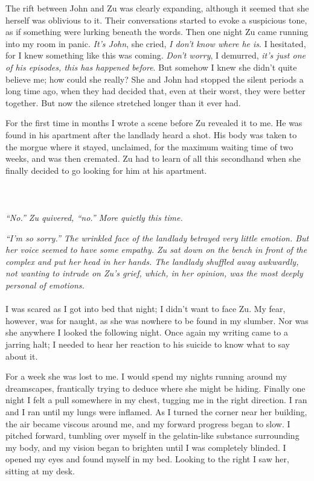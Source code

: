 \documentclass[12pt,oneside,openany]{memoir}
\begin{document}
	The rift between John and Zu was clearly expanding, although it seemed that she herself was oblivious to it. Their conversations started to evoke a suspicious tone, as if something were lurking beneath the words. Then one night Zu came running into my room in panic. \textit{It’s John}, she cried,\textit{ I don’t know where he is}. I hesitated, for I knew something like this was coming. \textit{Don’t worry}, I demurred, \textit{it’s just one of his episodes, this has happened before}. But somehow I knew she didn’t quite believe me; how could she really? She and John had stopped the silent periods a long time ago, when they had decided that, even at their worst, they were better together. But now the silence stretched longer than it ever had.
	
\indent For the first time in months I wrote a scene before Zu revealed it to me. He was found in his apartment after the landlady heard a shot. His body was taken to the morgue where it stayed, unclaimed, for the maximum waiting time of two weeks, and was then cremated. Zu had to learn of all this secondhand when she finally decided to go looking for him at his apartment. 
\\\\	\\\\
\indent\textit{	“No.” Zu quivered, “no.” More quietly this time.}
	
\textit{	“I’m so sorry.” The wrinkled face of the landlady betrayed very little emotion. But her voice seemed to have some empathy. Zu sat down on the bench in front of the complex and put her head in her hands. The landlady shuffled away awkwardly, not wanting to intrude on Zu’s grief, which, in her opinion, was the most deeply personal of emotions.}
\\\\	
\indent I was scared as I got into bed that night; I didn’t want to face Zu. My fear, however, was for naught, as she was nowhere to be found in my slumber. Nor was she anywhere I looked the following night. Once again my writing came to a jarring halt; I needed to hear her reaction to his suicide to know what to say about it.
	
	For a week she was lost to me. I would spend my nights running around my dreamscapes, frantically trying to deduce where she might be hiding. Finally one night I felt a pull somewhere in my chest, tugging me in the right direction. I ran and I ran until my lungs were inflamed. As I turned the corner near her building, the air became viscous around me, and my forward progress began to slow. I pitched forward, tumbling over myself in the gelatin-like substance surrounding my body, and my vision began to brighten until I was completely blinded. I opened my eyes and found myself in my bed. Looking to the right I saw her, sitting at my desk.
	
\end{document}
